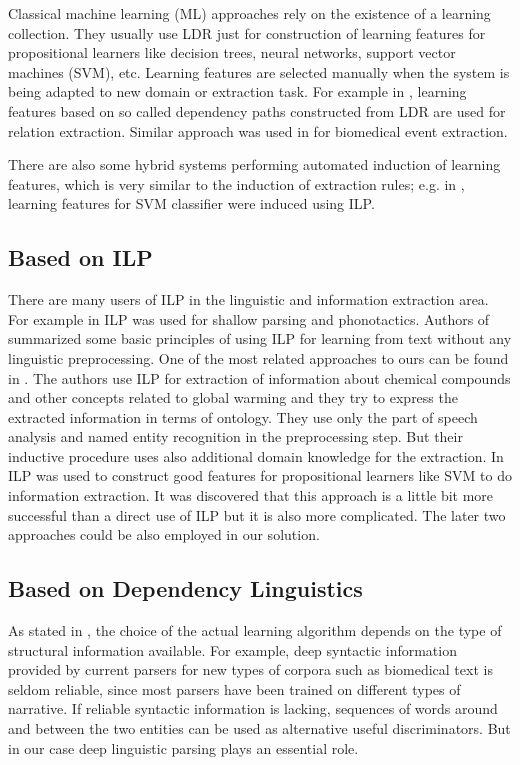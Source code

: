 Classical machine learning (ML) approaches rely on the existence of a learning collection. They usually use LDR just for construction of learning features for propositional learners like decision trees, neural networks, support vector machines (SVM), etc. Learning features are selected manually when the system is being adapted to new domain or extraction task. For example in \citep{Bunescu:DependencyPaths}, learning features based on so called dependency paths constructed from LDR are used for relation extraction. Similar approach was used in \citep{Buyko:dependencyGraphs} for biomedical event extraction.


There are also some hybrid systems performing automated induction of learning features, which is very similar to the induction of extraction rules; e.g. in \citep{DBLP:conf/ilp/RamakrishnanJBS07}, learning features for SVM classifier were induced using ILP. 





\subsection{Based on ILP}
There are many users of ILP in the linguistic and information extraction area.
For example in \citep{stasinos:phd} ILP was used for shallow parsing and phonotactics.
Authors of \citep{Junker99learningfor} summarized some basic principles of using ILP for learning from text without any linguistic preprocessing. One of the most related approaches to ours can be found in \citep{aitken02:_learn_infor_extrac_rules}. The authors use ILP for extraction of information about chemical compounds and other concepts related to global warming and they try to express the extracted information in terms of ontology. They use only the part of speech analysis and named entity recognition in the preprocessing step. But their inductive procedure uses also additional domain knowledge for the extraction. In \citep{DBLP:conf/ilp/RamakrishnanJBS07} ILP was used to construct good features for propositional learners like SVM to do information extraction. It was discovered that this approach is a little bit more successful than a direct use of ILP but it is also more complicated. The later two approaches could be also employed in our solution.

\subsection{Based on Dependency Linguistics}
As stated in \citep{Bunescu:phd}, the choice of the actual learning algorithm depends on the type of structural information available. For example, deep syntactic information provided by current parsers for new types of corpora such as biomedical text is seldom reliable, since most parsers have been trained on different types of narrative. If reliable syntactic information is lacking, sequences of words around and between the two entities can be used as alternative useful discriminators.
But in our case deep linguistic parsing plays an essential role.

